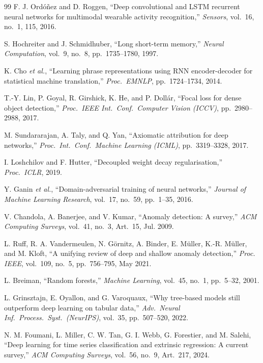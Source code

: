\documentclass[conference,a4paper]{IEEEtran}
\begin{document}
\begin{thebibliography}{99}
F. J. Ordóñez and D. Roggen,
``Deep convolutional and LSTM recurrent neural networks for multimodal
wearable activity recognition,''
\textit{Sensors}, vol.~16, no.~1, 115, 2016.

S. Hochreiter and J. Schmidhuber,
``Long short-term memory,''
\textit{Neural Computation}, vol.~9, no.~8, pp.~1735--1780, 1997.

K. Cho \textit{et al.},
``Learning phrase representations using RNN encoder-decoder for statistical
machine translation,''
\textit{Proc.\ EMNLP}, pp.~1724--1734, 2014.

T.-Y. Lin, P. Goyal, R. Girshick, K. He, and P. Dollár,
``Focal loss for dense object detection,''
\textit{Proc.\ IEEE Int.\ Conf.\ Computer Vision (ICCV)}, pp.~2980--2988, 2017.

M. Sundararajan, A. Taly, and Q. Yan,
``Axiomatic attribution for deep networks,''
\textit{Proc.\ Int.\ Conf.\ Machine Learning (ICML)}, pp.~3319--3328, 2017.

I. Loshchilov and F. Hutter,
``Decoupled weight decay regularisation,''
\textit{Proc.\ ICLR}, 2019.

Y. Ganin \textit{et al.},
``Domain-adversarial training of neural networks,''
\textit{Journal of Machine Learning Research}, vol.~17, no.~59, pp.~1--35, 2016.

V. Chandola, A. Banerjee, and V. Kumar,
``Anomaly detection: A survey,''
\textit{ACM Computing Surveys}, vol.~41, no.~3, Art.~15, Jul. 2009.

L. Ruff, R. A. Vandermeulen, N. G\"{o}rnitz, A. Binder, E. M\"{u}ller,
K.-R. M\"{u}ller, and M. Kloft,
``A unifying review of deep and shallow anomaly detection,''
\textit{Proc. IEEE}, vol.~109, no.~5, pp.~756--795, May 2021.

L. Breiman,
``Random forests,''
\textit{Machine Learning}, vol.~45, no.~1, pp.~5--32, 2001.

L. Grinsztajn, E. Oyallon, and G. Varoquaux,
``Why tree-based models still outperform deep learning on tabular data,''
\textit{Adv.\ Neural Inf.\ Process.\ Syst.\ (NeurIPS)}, vol.~35, pp.~507--520, 2022.

N. M. Foumani, L. Miller, C. W. Tan, G. I. Webb, G. Forestier, and M. Salehi,
``Deep learning for time series classification and extrinsic regression: A current survey,''
\textit{ACM Computing Surveys}, vol.~56, no.~9, Art.~217, 2024.


\end{thebibliography}
\end{document}
